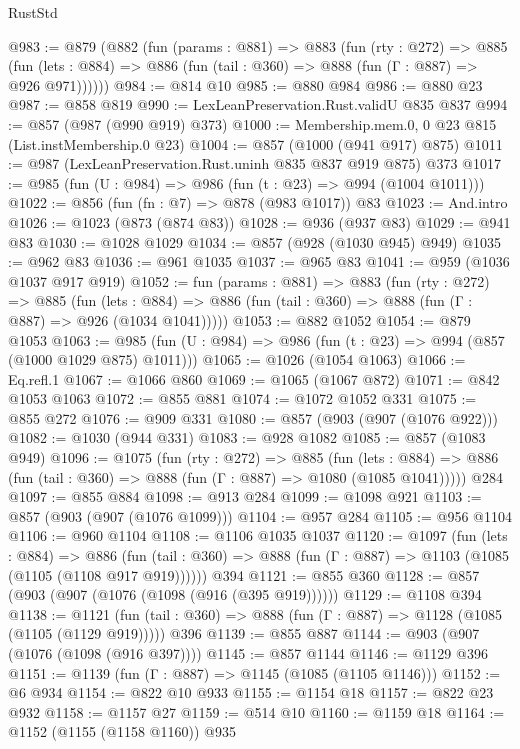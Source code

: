\begin{lexlean}{RustStd}
\begin{coremodule}
@983 := @879
    (@882
      (fun (params : @881) =>
      @883
        (fun (rty : @272) =>
        @885
          (fun (lets : @884) => @886 (fun (tail : @360) => @888 (fun (Γ : @887) => @926 @971))))))
@984 := @814 @10
@985 := @880 @984
@986 := @880 @23
@987 := @858 @819
@990 := LexLeanPreservation.Rust.validU @835 @837
@994 := @857 (@987 (@990 @919) @373)
@1000 := Membership.mem.{0, 0} @23 @815 (List.instMembership.{0} @23)
@1004 := @857 (@1000 (@941 @917) @875)
@1011 := @987 (LexLeanPreservation.Rust.uninh @835 @837 @919 @875) @373
@1017 := @985 (fun (U : @984) => @986 (fun (t : @23) => @994 (@1004 @1011)))
@1022 := @856 (fun (fn : @7) => @878 (@983 @1017)) @83
@1023 := And.intro
@1026 := @1023 (@873 (@874 @83))
@1028 := @936 (@937 @83)
@1029 := @941 @83
@1030 := @1028 @1029
@1034 := @857 (@928 (@1030 @945) @949)
@1035 := @962 @83
@1036 := @961 @1035
@1037 := @965 @83
@1041 := @959 (@1036 @1037 @917 @919)
@1052 := fun (params : @881) =>
  @883
    (fun (rty : @272) =>
    @885
      (fun (lets : @884) =>
      @886 (fun (tail : @360) => @888 (fun (Γ : @887) => @926 (@1034 @1041)))))
@1053 := @882 @1052
@1054 := @879 @1053
@1063 := @985 (fun (U : @984) => @986 (fun (t : @23) => @994 (@857 (@1000 @1029 @875) @1011)))
@1065 := @1026 (@1054 @1063)
@1066 := Eq.refl.{1}
@1067 := @1066 @860
@1069 := @1065 (@1067 @872)
@1071 := @842 @1053 @1063
@1072 := @855 @881
@1074 := @1072 @1052 @331
@1075 := @855 @272
@1076 := @909 @331
@1080 := @857 (@903 (@907 (@1076 @922)))
@1082 := @1030 (@944 @331)
@1083 := @928 @1082
@1085 := @857 (@1083 @949)
@1096 := @1075
    (fun (rty : @272) =>
    @885
      (fun (lets : @884) =>
      @886 (fun (tail : @360) => @888 (fun (Γ : @887) => @1080 (@1085 @1041)))))
    @284
@1097 := @855 @884
@1098 := @913 @284
@1099 := @1098 @921
@1103 := @857 (@903 (@907 (@1076 @1099)))
@1104 := @957 @284
@1105 := @956 @1104
@1106 := @960 @1104
@1108 := @1106 @1035 @1037
@1120 := @1097
    (fun (lets : @884) =>
    @886 (fun (tail : @360) => @888 (fun (Γ : @887) => @1103 (@1085 (@1105 (@1108 @917 @919))))))
    @394
@1121 := @855 @360
@1128 := @857 (@903 (@907 (@1076 (@1098 (@916 (@395 @919))))))
@1129 := @1108 @394
@1138 := @1121
    (fun (tail : @360) => @888 (fun (Γ : @887) => @1128 (@1085 (@1105 (@1129 @919)))))
    @396
@1139 := @855 @887
@1144 := @903 (@907 (@1076 (@1098 (@916 @397))))
@1145 := @857 @1144
@1146 := @1129 @396
@1151 := @1139 (fun (Γ : @887) => @1145 (@1085 (@1105 @1146)))
@1152 := @6 @934
@1154 := @822 @10 @933
@1155 := @1154 @18
@1157 := @822 @23 @932
@1158 := @1157 @27
@1159 := @514 @10
@1160 := @1159 @18
@1164 := @1152 (@1155 (@1158 @1160)) @935

\end{coremodule}
\end{lexlean}
